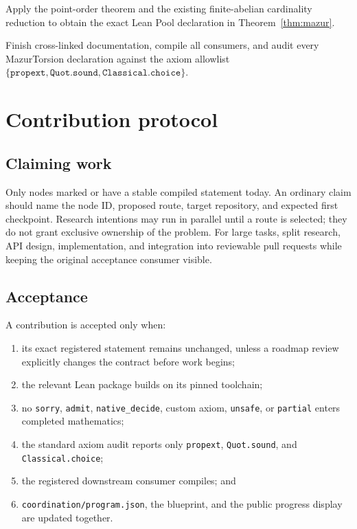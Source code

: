 \begin{theorem}\label{node:MT-FINAL-ASSEMBLY}
Apply the point-order theorem and the existing finite-abelian cardinality
reduction to obtain the exact Lean Pool declaration in
Theorem~\ref{thm:mazur}.
\leanpending
\end{theorem}

\begin{milestone}\label{node:MT-EXPOSITION-AUDIT}
Finish cross-linked documentation, compile all consumers, and audit every
MazurTorsion declaration against the axiom allowlist
\(\{\texttt{propext},\texttt{Quot.sound},\texttt{Classical.choice}\}\).
\leanpending
\end{milestone}

\chapter{Contribution protocol}

\section{Claiming work}

Only nodes marked \claimable{} or \researchopen{} have a stable compiled
statement today.  An ordinary claim should name the node ID, proposed route,
target repository, and expected first checkpoint.  Research intentions may
run in parallel until a route is selected; they do not grant exclusive
ownership of the problem.  For large tasks, split research, API design,
implementation, and integration into reviewable pull requests while keeping
the original acceptance consumer visible.

\section{Acceptance}

A contribution is accepted only when:
\begin{enumerate}
\item its exact registered statement remains unchanged, unless a roadmap
      review explicitly changes the contract before work begins;
\item the relevant Lean package builds on its pinned toolchain;
\item no \texttt{sorry}, \texttt{admit}, \texttt{native\_decide}, custom
      axiom, \texttt{unsafe}, or \texttt{partial} enters completed mathematics;
\item the standard axiom audit reports only \texttt{propext},
      \texttt{Quot.sound}, and \texttt{Classical.choice};
\item the registered downstream consumer compiles; and
\item \texttt{coordination/program.json}, the blueprint, and the public
      progress display are updated together.
\end{enumerate}

